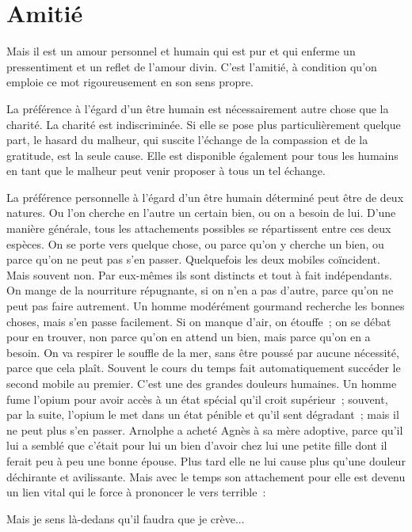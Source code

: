 \documentclass[french,twoside]{book} %
\begin{document}
\section[{Amitié}]{Amitié}
\noindent Mais il est un amour personnel et humain qui est pur et qui enferme un pressentiment et un reflet de l'amour divin. C'est l'amitié, à condition qu'on emploie ce mot rigoureusement en son sens propre.\par
La préférence à l'égard d'un être humain est nécessairement autre chose que la charité. La charité est indiscriminée. Si elle se pose plus particulièrement quelque part, le hasard du malheur, qui suscite l'échange de la compassion et de la gratitude, est la seule cause. Elle est disponible également pour tous les humains en tant que le malheur peut venir proposer à tous un tel échange.\par
La préférence personnelle à l'égard d'un être humain déterminé peut être de deux natures. Ou l'on cherche en l'autre un certain bien, ou on a besoin de lui. D'une manière générale, tous les attachements possibles se répartissent entre ces deux espèces. On se porte vers quelque chose, ou parce qu'on y cherche un bien, ou parce qu'on ne peut pas s'en passer. Quelquefois les deux mobiles coïncident. Mais souvent non. Par eux-mêmes ils sont distincts et tout à fait indépendants. On mange de la nourriture répugnante, si on n'en a pas d'autre, parce qu'on ne peut pas faire autrement. Un homme modérément gourmand recherche les bonnes choses, mais s'en passe facilement. Si on manque d'air, on étouffe ; on se débat pour en trouver, non parce qu'on en attend un bien, mais parce qu'on en a besoin. On va respirer le souffle de la mer, sans être poussé par aucune nécessité, parce que cela plaît. Souvent le cours du temps fait automatiquement succéder le second mobile au premier. C'est une des grandes douleurs humaines. Un homme fume l'opium pour avoir accès à un état spécial qu'il croit supérieur ; souvent, par la suite, l'opium le met dans un état pénible et qu'il sent dégradant ; mais il ne peut plus s'en passer. Arnolphe a acheté Agnès à sa mère adoptive, parce qu'il lui a semblé que c'était pour lui un bien d'avoir chez lui une petite fille dont il ferait peu à peu une bonne épouse. Plus tard elle ne lui cause plus qu'une douleur déchirante et avilissante. Mais avec le temps son attachement pour elle est devenu un lien vital qui le force à prononcer le vers terrible :\par
Mais je sens là-dedans qu'il faudra que je crève...\par
\end{document}
